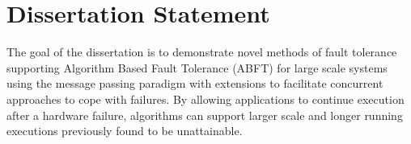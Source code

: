 \section{Dissertation Statement}\label{sect:dissertation}

The goal of the dissertation is to demonstrate novel methods of fault tolerance
supporting Algorithm Based Fault Tolerance (ABFT) for large scale systems using
the message passing paradigm with extensions to facilitate concurrent approaches
to cope with failures. By allowing applications to continue execution after a
hardware failure, algorithms can support larger scale and longer running
executions previously found to be unattainable.
